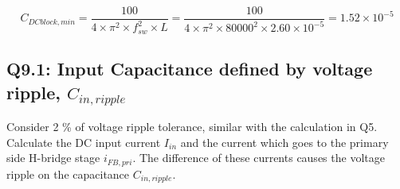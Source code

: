 \documentclass{PELsmallreport}
\begin{document}
    \begin{framed}
        \vspace{2em}
        \[
        C_{DCblock,min} = \frac{100}{4 \times \pi^2 \times f_{sw}^2 \times L} = \frac{100}{4 \times \pi^2 \times 80 000^2 \times 2.60 \times 10^{-5}} = 1.52 \times 10^{-5}
        \]
        \vspace{2em}
    \end{framed}
        
     \quad
    \hfill{}
\subsection{Q9.1: Input Capacitance defined by voltage ripple, $C_{in, ripple}$}

Consider 2 \% of voltage ripple tolerance, similar with the calculation in Q5. Calculate the DC input current $I_{in}$ and the current which goes to the primary side H-bridge stage $i_{FB,pri}$. The difference of these currents causes the voltage ripple on the capacitance $C_{in, ripple}$.\\
\end{document}
